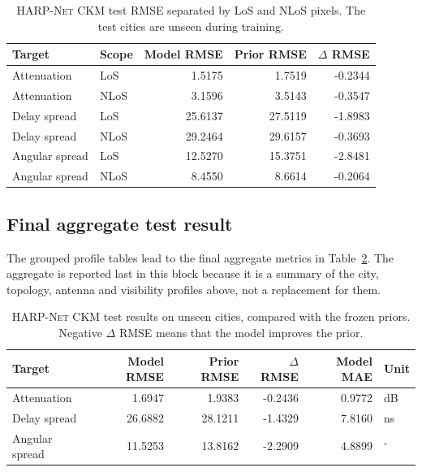 \begin{table}[!htbp]
\centering
\caption{\textsc{HARP-Net CKM} test RMSE separated by LoS and NLoS pixels. The test
cities are unseen during training.}
\label{tab:try80_final_test_los_nlos}
\scriptsize
\begin{tabular}{llrrr}
\toprule
Target & Scope & Model RMSE & Prior RMSE & \(\Delta\) RMSE \\
\midrule
Attenuation & LoS & 1.5175 & 1.7519 & -0.2344 \\
Attenuation & NLoS & 3.1596 & 3.5143 & -0.3547 \\
Delay spread & LoS & 25.6137 & 27.5119 & -1.8983 \\
Delay spread & NLoS & 29.2464 & 29.6157 & -0.3693 \\
Angular spread & LoS & 12.5270 & 15.3751 & -2.8481 \\
Angular spread & NLoS & 8.4550 & 8.6614 & -0.2064 \\
\bottomrule
\end{tabular}
\end{table}

\subsection{Final aggregate test result}

The grouped profile tables lead to the final aggregate metrics in
Table~\ref{tab:try80_final_test_overall}. The aggregate is reported last in
this block because it is a summary of the city, topology, antenna and visibility
profiles above, not a replacement for them.

\begin{table}[!htbp]
\centering
\caption[\textsc{HARP-Net CKM} test results on unseen cities.]
{\textsc{HARP-Net CKM} test results on unseen cities, compared with the frozen
priors. Negative \(\Delta\) RMSE means that the model improves the prior.}
\label{tab:try80_final_test_overall}
\scriptsize
\begin{tabular}{lrrrrl}
\toprule
Target & Model RMSE & Prior RMSE & \(\Delta\) RMSE & Model MAE & Unit \\
\midrule
Attenuation & 1.6947 & 1.9383 & -0.2436 & 0.9772 & dB \\
Delay spread & 26.6882 & 28.1211 & -1.4329 & 7.8160 & ns \\
Angular spread & 11.5253 & 13.8162 & -2.2909 & 4.8899 & \(^{\circ}\) \\
\bottomrule
\end{tabular}
\end{table}

